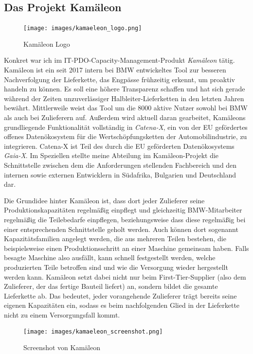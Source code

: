 \documentclass[11pt, a4paper, oneside]{scrartcl}
\begin{document}
        \subsection{Das Projekt Kamäleon}
        \begin{figure}[!htb] %
            \centering
            \texttt{[image: images/kamaeleon\_logo.png]}
            \caption{Kamäleon Logo}
        \end{figure}
        Konkret war ich im IT-PDO-Capacity-Management-Produkt \textit{Kamäleon} tätig.
        Kamäleon ist ein seit 2017 intern bei BMW entwickeltes Tool zur besseren Nachverfolgung der
        Lieferkette, das Engpässe frühzeitig erkennt, um proaktiv handeln zu können.
        Es soll eine höhere Transparenz schaffen und hat sich gerade während der Zeiten
        unzuverlässiger Halbleiter-Lieferketten in den letzten Jahren bewährt.
        \textcite{cio:kamaeleon}
        Mittlerweile weist das Tool um die 8000 aktive Nutzer sowohl bei BMW als auch bei
        Zulieferern auf.
        Außerdem wird aktuell daran gearbeitet, Kamäleons grundliegende Funktionalität vollständig
        in \textit{Catena-X}, ein von der EU gefördertes offenes Datenökosystem für die
        Wertschöpfungsketten der Automobilindustrie, zu integrieren.
        Catena-X ist Teil des durch die EU geförderten Datenökosystems \textit{Gaia-X}.
        \textcite{catenaX:about,catenaX:compliance}
        Im Speziellen stellte meine Abteilung im Kamäleon-Projekt die Schnittstelle zwischen dem die
        Anforderungen stellenden Fachbereich und den internen sowie externen Entwicklern in
        Südafrika, Bulgarien und Deutschland dar.\par
        Die Grundidee hinter Kamäleon ist, dass dort jeder Zulieferer seine Produktionskapazitäten
        regelmäßig einpflegt und gleichzeitig BMW-Mitarbeiter regelmäßig die Teilebedarfe
        einpflegen, beziehungsweise dass diese regelmäßig bei einer entsprechenden Schnittstelle
        geholt werden.
        Auch können dort sogenannt Kapazitätsfamilien angelegt werden, die aus mehreren Teilen
        bestehen, die  beispielsweise einen Produktionsschritt an einer Maschine gemeinsam haben.
        Falls besagte Maschine also ausfällt, kann schnell festgestellt werden, welche produzierten
        Teile betroffen sind und wie die Versorgung wieder hergestellt werden kann.
        Kamäleon setzt dabei nicht nur beim First-Tier-Supplier (also dem Zulieferer, der das
        fertige Bauteil liefert) an, sondern bildet die gesamte Lieferkette ab.
        Das bedeutet, jeder vorangehende Zulieferer trägt bereits seine eigenen Kapazitäten ein,
        sodass es beim nachfolgenden Glied in der Lieferkette nicht zu einem Versorgungsfall kommt.
        \par
        \begin{figure}[H] %
            \centering
            \texttt{[image: images/kamaeleon\_screenshot.png]}
            \caption{Screenshot von Kamäleon}
        \end{figure}
\end{document}
